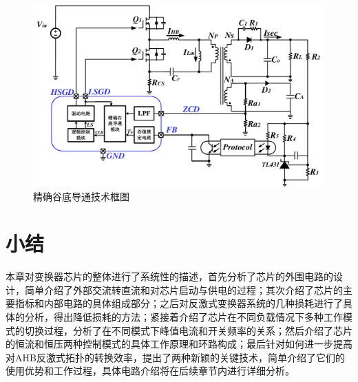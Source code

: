 \begin{figure}[htbp] 
    \centering
    \includegraphics[width=0.8\linewidth]{figures/精确谷底导通技术框图.pdf}
    \caption{精确谷底导通技术框图}
    \label{fig:精确谷底导通技术框图}
\end{figure}



\section{小结}

本章对变换器芯片的整体进行了系统性的描述，首先分析了芯片的外围电路的设计，简单介绍了外部交流转直流和对芯片启动与供电的过程；其次介绍了芯片的主要指标和内部电路的具体组成部分；之后对反激式变换器系统的几种损耗进行了具体的分析，得出降低损耗的方法；紧接着介绍了芯片在不同负载情况下多种工作模式的切换过程，分析了在不同模式下峰值电流和开关频率的关系；然后介绍了芯片的恒流和恒压两种控制模式的具体工作原理和环路构成；最后针对如何进一步提高对AHB反激式拓扑的转换效率，提出了两种新颖的关键技术，简单介绍了它们的使用优势和工作过程，具体电路介绍将在后续章节内进行详细分析。



